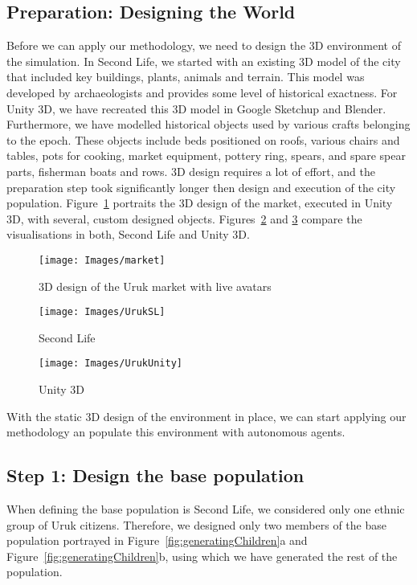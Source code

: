 \documentclass[graybox]{svmult}
\begin{document}
\subsection{Preparation: Designing the World} 

Before we can apply our methodology, we need to design the 3D environment of the simulation. In Second Life, we started with an existing 3D model of the city that included key buildings, plants, animals and terrain. This model was developed by archaeologists and provides some level of historical exactness. For Unity 3D, we have recreated this 3D model in Google Sketchup and Blender. Furthermore, we have modelled historical objects used by various crafts belonging to the epoch. These 
objects include beds positioned on roofs, various chairs and tables, pots for cooking, market equipment, pottery ring, spears, and spare spear parts, fisherman boats and rows. 3D design requires a lot of effort, and the preparation step took significantly longer then design and execution of the city population. Figure~\ref{fig:market} portraits the 3D design of the market, executed in Unity 3D, with several, custom designed objects. Figures~\ref{fig:sl} and \ref{fig:unity} compare the visualisations in both, Second Life and Unity 3D. 

\begin{figure}[!ht]
    \centering
    \texttt{[image: Images/market]}
    \caption{3D design of the Uruk market with live avatars}
    \label{fig:market}
\end{figure}%


\begin{figure}[!ht]
	\texttt{[image: Images/UrukSL]} 
	\caption{Second Life}
	\label{fig:sl}
\end{figure}

\begin{figure}[!ht]
	\texttt{[image: Images/UrukUnity]}
	\caption{Unity 3D}
	\label{fig:unity}
\end{figure}


With the static 3D design of the environment in place, we can start applying our methodology an populate this environment with autonomous agents.  
 
\subsection{Step 1: Design the base population}

When defining the base population is Second Life, we considered only one ethnic group of Uruk citizens. Therefore, we designed only two members of the base population portrayed in Figure~\ref{fig:generatingChildren}a and Figure~\ref{fig:generatingChildren}b, using which we have generated the rest of the population. 
\end{document}
